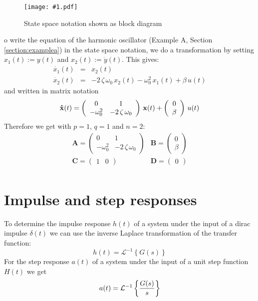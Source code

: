 \documentclass[a4paper,12pt]{article}
\newcommand{\Fig}[4]{%
\begin{figure}[htb]%
\begin{center}%
\texttt{[image: \#1.pdf]}%
\end{center}%
\caption{#3\label{fig:#1}}%
\end{figure}%
}
\renewcommand{\Vec}[1]{{\bf #1}}
\newcommand{\Mat}[1]{\mathbf{#1}}
\newcommand{\Section}[2]{\section{#2}\label{section:#1}}
\newcommand{\SRef}[1]{Section \ref{section:#1}}
\begin{document}
\Fig{statespace}{0.8}{State space notation shown as block diagram}

To write the equation of the harmonic oscillator (Example A, \SRef{examplea}) in the state space notation, we do a transformation by setting $x_1(t):=y(t)$ and $x_2(t):=\dot{y}(t)$. This gives:
\begin{eqnarray}
	\dot{x_1}(t)&=&x_2(t)\\
	\dot{x_2}(t)&=&-2\,\zeta\,\omega_0\,x_2(t)-\omega_0^2\,x_1(t)+\beta\,u(t)
\end{eqnarray}
and written in matrix notation
\begin{equation}
\Vec{\dot{x}}(t)=\left(\begin{array}{cc}0 & 1\\-\omega_0^2 & -2\,\zeta\,\omega_0\end{array}\right)\,\Vec{x}(t)+\left(\begin{array}{c}0\\\beta\end{array}\right)\,u(t)
\end{equation}
Therefore we get with $p=1$, $q=1$ and $n=2$:
\begin{equation}
\begin{array}{ll}
	\Mat{A}=\left(\begin{array}{cc}
		0 & 1\\
		-\omega_0^2 & -2\,\zeta\,\omega_0
	\end{array}\right) &
	\Mat{B}=\left(\begin{array}{c}
		0\\
		\beta
	\end{array}\right)\\[4ex]
	\Mat{C}=\left(\begin{array}{cc}
		1 & 0
	\end{array}\right) &
	\Mat{D}=\left(\begin{array}{c}
		0
	\end{array}\right)\\
\end{array}
\end{equation}

\Section{impulsestep}{Impulse and step responses}

To determine the impulse response $h(t)$ of a system under the input of a dirac impulse $\delta(t)$ we can use the inverse Laplace transformation of the transfer function:
\begin{equation}
h(t)=\mathcal{L}^{-1}\left\{G(s)\right\}
\end{equation}
For the step response $a(t)$ of a system under the input of a unit step function $H(t)$ we get
\begin{equation}
a(t)=\mathcal{L}^{-1}\left\{{G(s)}\over{s}\right\}
\end{equation}
\end{document}
